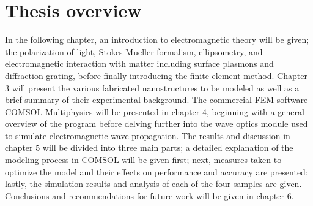 \section{Thesis overview}
In the following chapter, an introduction to electromagnetic theory will be given; the polarization of light, Stokes-Mueller formalism, ellipsometry, and electromagnetic interaction with matter including surface plasmons and diffraction grating, before finally introducing the finite element method. Chapter 3 will present the various fabricated nanostructures to be modeled as well as a brief summary of their experimental background. The commercial FEM software COMSOL Multiphysics will be presented in chapter 4, beginning with a general overview of the program before delving further into the wave optics module used to simulate electromagnetic wave propagation. The results and discussion in chapter 5 will be divided into three main parts; a detailed explanation of the modeling process in COMSOL will be given first; next, measures taken to optimize the model and their effects on performance and accuracy are presented; lastly, the simulation results and analysis of each of the four samples are given. Conclusions and recommendations for future work will be given in chapter 6. 






